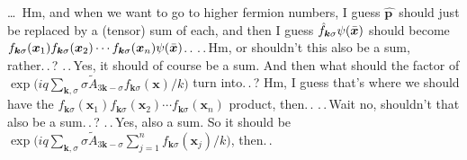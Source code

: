 \documentclass{report}
\begin{document}
\ldots\ Hm, and when we want to go to higher fermion numbers, I guess $\hat{\boldsymbol p\,}\!$ should just be replaced by a (tensor) sum of each, and then I guess $\hat f_{\boldsymbol{k} \sigma}\psi(\bar{\boldsymbol{x}\hspace{.05em}}\hspace{-.05em})$ should become 
$f_{\boldsymbol{k} \sigma}({{\boldsymbol{x}\hspace{.05em}}\hspace{-.05em}}_1) 
f_{\boldsymbol{k} \sigma}({{\boldsymbol{x}\hspace{.05em}}\hspace{-.05em}}_2) \cdots
f_{\boldsymbol{k} \sigma}({{\boldsymbol{x}\hspace{.05em}}\hspace{-.05em}}_n)
\psi(\bar{\boldsymbol{x}\hspace{.05em}}\hspace{-.05em})$.\,. 
.\,.\,Hm, or shouldn't this also be a sum, rather.\,.\,? .\,.\,Yes, it should of course be a sum. And then what should the factor of $\exp\big(
	i q \sum_{\boldsymbol{k}, \sigma} \sigma \tilde A_{3\boldsymbol{k}-\sigma} 
	f_{\boldsymbol{k}\sigma}(\boldsymbol{x}) / k
\big)$ turn into.\,.\,? Hm, I guess that's where we should have the 
$f_{\boldsymbol{k} \sigma}({\boldsymbol{x}}_1) 
f_{\boldsymbol{k} \sigma}({\boldsymbol{x}}_2) \cdots
f_{\boldsymbol{k} \sigma}({\boldsymbol{x}}_n)$ product, then.\,. .\,.\,Wait no, shouldn't that also be a sum.\,.\,? .\,.\,Yes, also a sum. So it should be $\exp\big(
	i q \sum_{\boldsymbol{k}, \sigma} \sigma \tilde A_{3\boldsymbol{k}-\sigma} 
	\sum_{j=1}^n f_{\boldsymbol{k}\sigma}(\boldsymbol{x}_j) / k
\big)$, then.\,. 
\end{document}
